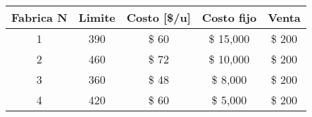 \begin{tabular}{ccccc}
Fabrica N & Limite & Costo [\$/u] & Costo fijo & Venta \bigstrut[b]\\
\hline
\hline
1      & 390    &  \$            60  &  \$       15,000  &  \$        200  \bigstrut[t]\\
2      & 460    &  \$            72  &  \$       10,000  &  \$        200  \\
3      & 360    &  \$            48  &  \$          8,000  &  \$        200  \\
4      & 420    &  \$            60  &  \$          5,000  &  \$        200  \bigstrut[b]\\
\hline
\hline
\end{tabular}%
